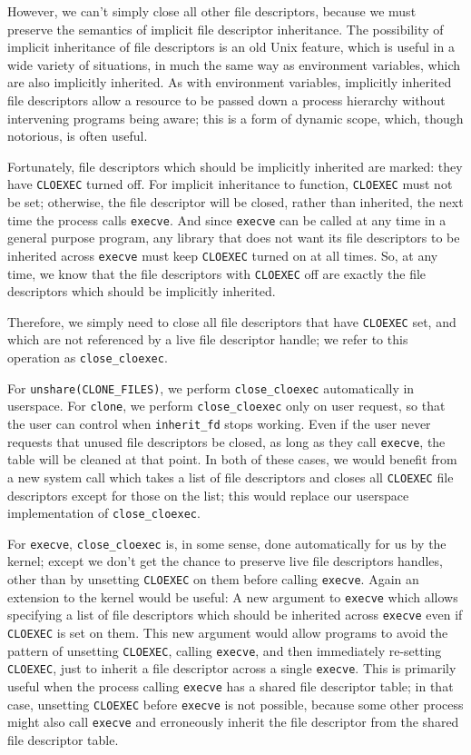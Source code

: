 \documentclass[letterpaper,twocolumn,10pt]{article}
\begin{document}
However, we can't simply close all other file descriptors,
because we must preserve the semantics of implicit file descriptor inheritance.
The possibility of implicit inheritance of file descriptors is an old Unix feature,
which is useful in a wide variety of situations,
in much the same way as environment variables, which are also implicitly inherited.
As with environment variables,
implicitly inherited file descriptors allow a resource to be passed down a process hierarchy
without intervening programs being aware;
this is a form of dynamic scope, which, though notorious, is often useful.

Fortunately, file descriptors which should be implicitly inherited are marked:
they have \texttt{CLOEXEC} turned off.
For implicit inheritance to function, \texttt{CLOEXEC} must not be set;
otherwise, the file descriptor will be closed, rather than inherited,
the next time the process calls \texttt{execve}.
And since \texttt{execve} can be called at any time in a general purpose program,
any library that does not want its file descriptors to be inherited across \texttt{execve}
must keep \texttt{CLOEXEC} turned on at all times.
So, at any time, we know that the file descriptors with \texttt{CLOEXEC} off
are exactly the file descriptors which should be implicitly inherited.

Therefore, we simply need to close all file descriptors that have \texttt{CLOEXEC} set,
and which are not referenced by a live file descriptor handle;
we refer to this operation as \verb|close_cloexec|.

For \verb|unshare(CLONE_FILES)|, we perform \verb|close_cloexec| automatically in userspace.
For \texttt{clone}, we perform \verb|close_cloexec| only on user request,
so that the user can control when \verb|inherit_fd| stops working.
Even if the user never requests that unused file descriptors be closed,
as long as they call \texttt{execve}, the table will be cleaned at that point.
In both of these cases,
we would benefit from a new system call which takes a list of file descriptors
and closes all \texttt{CLOEXEC} file descriptors except for those on the list;
this would replace our userspace implementation of \verb|close_cloexec|.

For \texttt{execve}, \verb|close_cloexec| is, in some sense, done automatically for us by the kernel;
except we don't get the chance to preserve live file descriptors handles,
other than by unsetting \texttt{CLOEXEC} on them before calling \texttt{execve}.
Again an extension to the kernel would be useful:
A new argument to \texttt{execve} which allows specifying a list of file descriptors
which should be inherited across \texttt{execve} even if \texttt{CLOEXEC} is set on them.
This new argument would allow programs to avoid the pattern
of unsetting \texttt{CLOEXEC}, calling \texttt{execve}, and then immediately re-setting \texttt{CLOEXEC},
just to inherit a file descriptor across a single \texttt{execve}.
This is primarily useful when the process calling \texttt{execve} has a shared file descriptor table;
in that case, unsetting \texttt{CLOEXEC} before \texttt{execve} is not possible,
because some other process might also call \texttt{execve}
and erroneously inherit the file descriptor from the shared file descriptor table.
\end{document}
